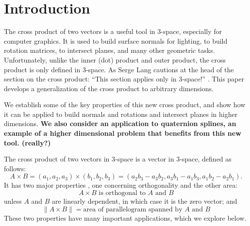 \documentclass[10pt]{article}
\newif\iftalk
\begin{document}

\section{Introduction}


The cross product of two vectors is a useful tool in 3-space, especially for computer graphics.
It is used to build surface normals for lighting, to build rotation matrices, to intersect planes, 
and 
many other geometric tasks.
Unfortunately, unlike the inner (dot) product and outer product,
the cross product is only defined in 3-space.
As Serge Lang cautions at the head of the section on the cross product:
``This section applies only in 3-space!'' \cite{lang71}. %
This paper develops a generalization of the cross product to arbitrary dimensions.

We establish some of the key properties of this new cross product,
and show how it can be applied to build normals and rotations and intersect planes
in higher dimensions.
{\bf We also consider an application to quaternion splines, an example of a higher dimensional
problem that benefits from this new tool. (really?)}

\iftalk
3 vector products: inner product, outer product, cross product
\fi

The cross product of two vectors in 3-space is a vector in 3-space, defined as follows:
\[
  A \times B = (a_1,a_2,a_3) \times (b_1,b_2,b_3) 
             = (a_2b_3 - a_3b_2, a_3b_1 - a_1b_3, a_1b_2 - a_2b_1).
\]
It has two major properties , one concerning orthogonality and the other area:
\begin{equation}
A \times B \mbox{ is orthogonal to } A \mbox{ and } B
\end{equation}
unless $A$ and $B$ are linearly dependent, in which case it is the zero vector; and 
\begin{equation}
\label{eq:area}
\|A \times B\| = \mbox{area of parallelogram spanned by } A \mbox{ and } B
\end{equation}
These two properties have many important applications, which we explore below.
\end{document}
